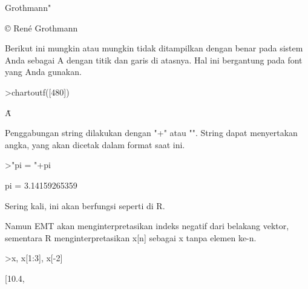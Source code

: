 \documentclass[a4paper,10pt]{article}
\begin{document}
\begin{eulernotebook}
\begin{eulercomment}
\begin{eulercomment}
\begin{eulercomment}
\begin{eulercomment}
\begin{eulercomment}
\begin{eulercomment}
\begin{eulercomment}
\begin{eulercomment}
\begin{eulercomment}
\begin{eulercomment}
\begin{eulercomment}
\begin{eulercomment}
\begin{eulercomment}
\begin{eulercomment}
\begin{eulercomment}
\begin{eulercomment}
\begin{eulercomment}
\begin{eulercomment}
\begin{eulercomment}
\begin{eulercomment}
\begin{eulercomment}
\begin{eulercomment}
\begin{eulercomment}
\begin{eulercomment}
\begin{eulercomment}
\begin{eulercomment}
\begin{eulercomment}
\begin{eulercomment}
\begin{eulercomment}
\begin{eulercomment}
\begin{eulercomment}
\begin{eulercomment}
\begin{eulercomment}
\begin{eulercomment}
\begin{eulercomment}
\begin{eulercomment}
\begin{eulercomment}
\begin{eulercomment}
\begin{eulercomment}
\begin{eulercomment}
\begin{eulercomment}
\begin{eulercomment}
\begin{eulercomment}
\begin{eulercomment}
\begin{eulercomment}
\begin{eulercomment}
\begin{eulercomment}
\begin{eulercomment}
\begin{eulercomment}
\begin{eulercomment}
\begin{eulercomment}
\begin{eulercomment}
\begin{eulercomment}
\begin{eulercomment}
\begin{eulercomment}
\begin{eulercomment}
\begin{eulercomment}
\begin{eulercomment}
\begin{eulercomment}
\begin{eulercomment}
\begin{eulercomment}
\begin{eulercomment}
\begin{eulercomment}
\begin{eulercomment}
\begin{eulercomment}
\begin{eulercomment}
\begin{eulercomment}
\begin{eulercomment}
\begin{eulerprompt}
Grothmann"
\end{eulerprompt}
\begin{euleroutput}
  © René Grothmann
\end{euleroutput}
\begin{eulercomment}
Berikut ini mungkin atau mungkin tidak ditampilkan dengan benar pada
sistem Anda sebagai A dengan titik dan garis di atasnya. Hal ini
bergantung pada font yang Anda gunakan.
\end{eulercomment}
\begin{eulerprompt}
>chartoutf([480])
\end{eulerprompt}
\begin{euleroutput}
  Ǡ
\end{euleroutput}
\begin{eulercomment}
Penggabungan string dilakukan dengan "+" atau "\textbar{}". String dapat
menyertakan angka, yang akan dicetak dalam format saat ini.
\end{eulercomment}
\begin{eulerprompt}
>"pi = "+pi
\end{eulerprompt}
\begin{euleroutput}
  pi = 3.14159265359
\end{euleroutput}
\begin{eulercomment}
Sering kali, ini akan berfungsi seperti di R.

Namun EMT akan menginterpretasikan indeks negatif dari belakang
vektor, sementara R menginterpretasikan x[n] sebagai x tanpa elemen
ke-n.
\end{eulercomment}
\begin{eulerprompt}
>x, x[1:3], x[-2]
\end{eulerprompt}
\begin{euleroutput}
  [10.4,  
\end{euleroutput}
\end{eulercomment}
\end{eulercomment}
\end{eulercomment}
\end{eulercomment}
\end{eulercomment}
\end{eulercomment}
\end{eulercomment}
\end{eulercomment}
\end{eulercomment}
\end{eulercomment}
\end{eulercomment}
\end{eulercomment}
\end{eulercomment}
\end{eulercomment}
\end{eulercomment}
\end{eulercomment}
\end{eulercomment}
\end{eulercomment}
\end{eulercomment}
\end{eulercomment}
\end{eulercomment}
\end{eulercomment}
\end{eulercomment}
\end{eulercomment}
\end{eulercomment}
\end{eulercomment}
\end{eulercomment}
\end{eulercomment}
\end{eulercomment}
\end{eulercomment}
\end{eulercomment}
\end{eulercomment}
\end{eulercomment}
\end{eulercomment}
\end{eulercomment}
\end{eulercomment}
\end{eulercomment}
\end{eulercomment}
\end{eulercomment}
\end{eulercomment}
\end{eulercomment}
\end{eulercomment}
\end{eulercomment}
\end{eulercomment}
\end{eulercomment}
\end{eulercomment}
\end{eulercomment}
\end{eulercomment}
\end{eulercomment}
\end{eulercomment}
\end{eulercomment}
\end{eulercomment}
\end{eulercomment}
\end{eulercomment}
\end{eulercomment}
\end{eulercomment}
\end{eulercomment}
\end{eulercomment}
\end{eulercomment}
\end{eulercomment}
\end{eulercomment}
\end{eulercomment}
\end{eulercomment}
\end{eulercomment}
\end{eulercomment}
\end{eulercomment}
\end{eulercomment}
\end{eulercomment}
\end{eulernotebook}
\end{document}
